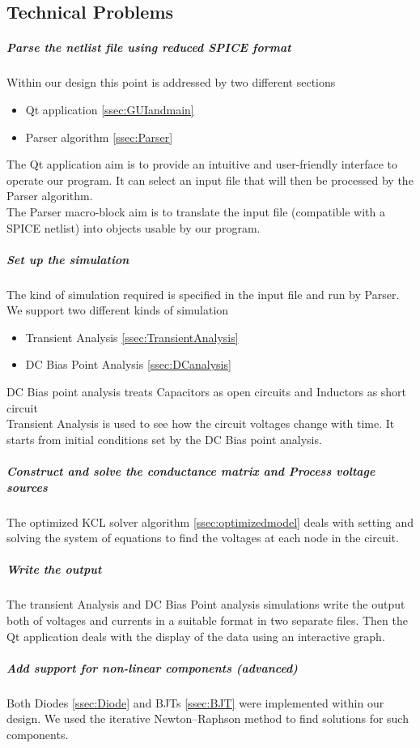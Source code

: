 \documentclass{article}
\begin{document}
\subsection{Technical Problems}
\subparagraph{Parse the netlist file using reduced SPICE format}
Within our design this point is addressed by two different sections
\begin{itemize}
    \item Qt application \ref{ssec:GUIandmain}
    \item Parser algorithm \ref{ssec:Parser}
\end{itemize}
The Qt application aim is to provide an intuitive and user-friendly interface to operate our program. It can select an input file that will then be processed by the Parser algorithm.\\
The Parser macro-block aim is to translate the input file (compatible with a SPICE netlist) into objects usable by our program.\\
\subparagraph{Set up the simulation }
The kind of simulation required is specified in the input file and run by Parser.\\
We support two different kinds of simulation
\begin{itemize}
    \item Transient Analysis \ref{ssec:TransientAnalysis}
    \item DC Bias Point Analysis \ref{ssec:DCanalysis}
\end{itemize}
DC Bias point analysis treats Capacitors as open circuits and Inductors as short circuit\\
Transient Analysis is used to see how the circuit voltages change with time. It starts from initial conditions set by the DC Bias point analysis.
\subparagraph{Construct and solve the conductance matrix and Process voltage sources}
The optimized KCL solver algorithm \ref{ssec:optimizedmodel} deals with setting and solving the system of equations to find the voltages at each node in the circuit.
\subparagraph{Write the output}
The transient Analysis and DC Bias Point analysis simulations write the output both of voltages and currents in a suitable format in two separate files. Then the Qt application deals with the display of the data using an interactive graph.
\subparagraph{ Add support for non-linear components (advanced)}
Both Diodes \ref{ssec:Diode} and BJTs \ref{ssec:BJT} were implemented within our design. We used the iterative Newton–Raphson method to find solutions for such components.\bigbreak
\end{document}
